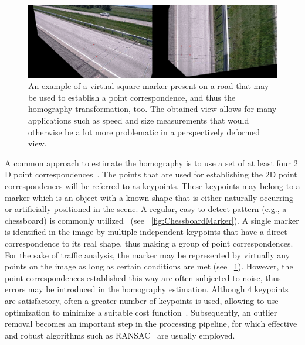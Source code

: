 \begin{figure}[t]
  \centerline{\includegraphics[width=\linewidth]{figures/homography/homography_road.png}}
  \caption[Square marker on a road]{An example of a virtual square marker present on a road that may be used to establish a point correspondence, and thus the homography transformation, too. The obtained view allows for many applications such as speed and size measurements that would otherwise be a lot more problematic in a perspectively deformed view. }
  \label{fig:RoadMarker}
\end{figure}

A common approach to estimate the homography is to use a set of at least four $2$D point correspondences~\cite{hartley1997defense}. The points that are used for establishing the $2$D point correspondences will be referred to as keypoints. These keypoints may belong to a marker which is an object with a known shape that is either naturally occurring or artificially positioned in the scene. A regular, easy-to-detect pattern (e.g., a chessboard) is commonly utilized~\cite{zhang2016flexible} (see \figstr{}~\ref{fig:ChessboardMarker}). A single marker is identified in the image by multiple independent keypoints that have a direct correspondence to its real shape, thus making a group of point correspondences. For the sake of traffic analysis, the marker may be represented by virtually any points on the image as long as certain conditions are met (see \figstr{}~\ref{fig:RoadMarker}). However, the point correspondences established this way are often subjected to noise, thus errors may be introduced in the homography estimation. Although $4$ keypoints are satisfactory, often a greater number of keypoints is used, allowing to use optimization to minimize a suitable cost function~\cite{osuna2016multiobjective, mou2013robust}. Subsequently, an outlier removal becomes an important step in the processing pipeline, for which effective and robust algorithms such as RANSAC~\cite{fischler1981ransac} are usually employed.

